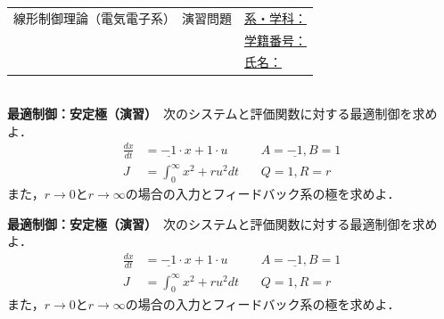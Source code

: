 \documentclass[a4paper,11pt]{jreport}
\begin{document}
\newpage
\begin{tabular}{cl}
\hspace*{2cm}
{\large 線形制御理論（電気電子系）　演習問題}
\hspace{1cm}
&
\underline{系・学科：\hspace{3cm}}
\\[2mm]
&\underline{学籍番号：\hspace{3cm}}
\\[2mm]
&\underline{氏名：\hspace{5cm}}
\end{tabular}
\ \\

\noindent
{\bf 最適制御：安定極（演習）}　次のシステムと評価関数に対する最適制御を求めよ．
\begin{align*}
	\frac{dx}{dt} & = \underline{-1} \cdot x + 1 \cdot u \ \ \ \ \ \ \ \ \ \ \ \ A=\underline{-1},B=1\\
	J & = \int_0^{\infty} x^2 + r u^2 dt \ \ \ \ \ \ \ \ Q=1,R=r
\end{align*}
また，$r\rightarrow 0$と$r\rightarrow \infty$の場合の入力とフィードバック系の極を求めよ．


\newpage

\noindent
{\bf 最適制御：安定極（演習）}　次のシステムと評価関数に対する最適制御を求めよ．
\begin{align*}
	\frac{dx}{dt} & =\underline{-1} \cdot x + 1 \cdot u \ \ \ \ \ \ \ \ \ \ \ \ A=\underline{-1},B=1\\
	J & = \int_0^{\infty} x^2 + r u^2 dt \ \ \ \ \ \ \ \ Q=1,R=r
\end{align*}
また，$r\rightarrow 0$と$r\rightarrow \infty$の場合の入力とフィードバック系の極を求めよ．
\\
\end{document}
